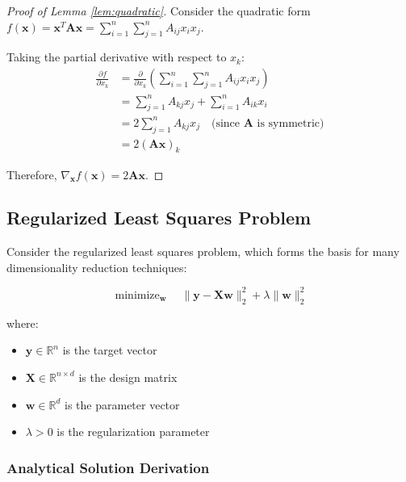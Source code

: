 \documentclass[12pt]{article}
\renewcommand{\vec}[1]{\mathbf{#1}}
\DeclareMathOperator{\minimize}{minimize}
\begin{document}
\begin{proof}[Proof of Lemma \ref{lem:quadratic}]
    Consider the quadratic form $f(\vec{x}) = \vec{x}^T \vec{A} \vec{x} = \sum_{i=1}^n \sum_{j=1}^n A_{ij} x_i x_j$.

    Taking the partial derivative with respect to $x_k$:
    \begin{align}
        \frac{\partial f}{\partial x_k} & = \frac{\partial}{\partial x_k} \left(\sum_{i=1}^n \sum_{j=1}^n A_{ij} x_i x_j\right) \\
                                        & = \sum_{j=1}^n A_{kj} x_j + \sum_{i=1}^n A_{ik} x_i                                   \\
                                        & = 2\sum_{j=1}^n A_{kj} x_j \quad \text{(since $\vec{A}$ is symmetric)}                \\
                                        & = 2(\vec{A}\vec{x})_k
    \end{align}

    Therefore, $\nabla_{\vec{x}} f(\vec{x}) = 2\vec{A}\vec{x}$.
\end{proof}

\subsection{Regularized Least Squares Problem}


Consider the regularized least squares problem, which forms the basis for many dimensionality reduction techniques:

\begin{equation}
    \minimize_{\vec{w}} \quad \|\vec{y} - \vec{X}\vec{w}\|_2^2 + \lambda \|\vec{w}\|_2^2
\end{equation}

where:
\begin{itemize}[noitemsep]
    \item $\vec{y} \in \mathbb{R}^n$ is the target vector
    \item $\vec{X} \in \mathbb{R}^{n \times d}$ is the design matrix
    \item $\vec{w} \in \mathbb{R}^d$ is the parameter vector
    \item $\lambda > 0$ is the regularization parameter
\end{itemize}

\subsubsection{Analytical Solution Derivation}
\end{document}

